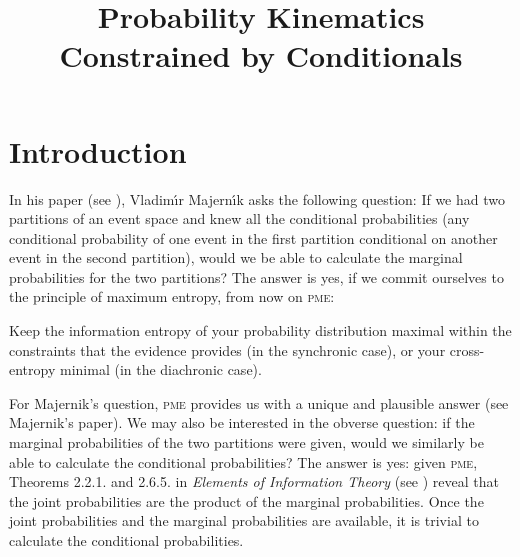 \documentclass[11pt]{article}
\begin{document}


\title{Probability Kinematics Constrained by Conditionals}
\author{}
\date{}
\maketitle
\doublespacing



\section{Introduction}
\label{Introduction}

In his paper  (see ),
Vladim{\'\i}r Majern{\'\i}k asks the following question: If we had two
partitions of an event space and knew all the conditional
probabilities (any conditional probability of one event in the first
partition conditional on another event in the second partition), would
we be able to calculate the marginal probabilities for the two
partitions? The answer is yes, if we commit ourselves to the principle
of maximum entropy, from now on \textsc{pme}:

\begin{quotex}
   Keep the information entropy of your probability
  distribution maximal within the constraints that the evidence
  provides (in the synchronic case), or your cross-entropy minimal (in
  the diachronic case).
\end{quotex}

For Majernik's question, \textsc{pme} provides us with a unique and
plausible answer (see Majernik's paper). We may also be interested in
the obverse question: if the marginal probabilities of the two
partitions were given, would we similarly be able to calculate the
conditional probabilities? The answer is yes: given \textsc{pme},
Theorems 2.2.1. and 2.6.5. in \emph{Elements of Information Theory}
(see ) reveal that the joint probabilities
are the product of the marginal probabilities. Once the joint
probabilities and the marginal probabilities are available, it is
trivial to calculate the conditional probabilities.
\end{document}

